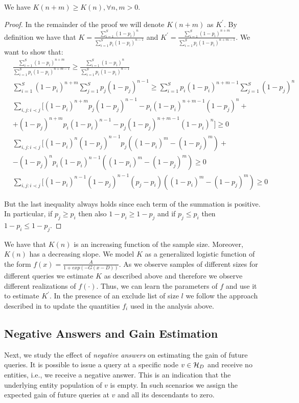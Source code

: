\begin{lemma}
We have $K(n+m) \geq K(n), \forall n,m > 0$.
\end{lemma}
\begin{proof}
In the remainder of the proof we will denote $K(n+m)$ as $K^{\prime}$. By definition we have that $K = \frac{\sum_{i=1}^S (1-p_i)^n}{\sum_{i=1}^S p_i(1-p_i)^{n-1}}$ and $K^{\prime} = \frac{\sum_{i=1}^S (1-p_i)^{n+m}}{\sum_{i=1}^S p_i(1-p_i)^{n+m-1}}$. We want to show that:
{\small
\begin{align}
&\frac{\sum_{i=1}^S (1-p_i)^{n+m}}{\sum_{i=1}^S p_i(1-p_i)^{n+m-1}} \geq \frac{\sum_{i=1}^S (1-p_i)^n}{\sum_{i=1}^S p_i(1-p_i)^{n-1}} \nonumber \\
&\sum_{i=1}^S (1-p_i)^{n+m}\sum_{j=1}^S p_j(1-p_j)^{n-1} \geq \sum_{i=1}^S p_i(1-p_i)^{n+m-1}\sum_{j=1}^S (1-p_j)^n\nonumber \\
&\sum_{i,j:i\prec j}[(1-p_i)^{n+m}p_j(1-p_j)^{n-1} - p_i(1-p_i)^{n+m-1}(1-p_j)^n + \nonumber \\
& + (1-p_j)^{n+m}p_i(1-p_i)^{n-1} - p_j(1-p_j)^{n+m-1}(1-p_i)^n] \geq 0 \nonumber \\
&\sum_{i,j:i\prec j}[(1-p_i)^{n}(1-p_j)^{n-1}p_j((1-p_i)^{m} - (1-p_j)^{m})  + \nonumber \\
& - (1-p_j)^{n}p_i(1-p_i)^{n-1}((1-p_i)^{m} - (1-p_j)^{m}) \geq 0 \nonumber \\
&\sum_{i,j:i\prec j}[(1-p_i)^{n-1}(1-p_j)^{n-1}(p_j-p_i)((1-p_i)^{m} - (1-p_j)^{m}) \geq 0
\end{align}}

But the last inequality always holds since each term of the summation is positive. In particular, if $p_j \geq p_i$ then
also $1-p_i \geq 1-p_j$ and if $p_j \leq p_i$ then $1-p_i \leq 1-p_j$.
\end{proof}

We have that $K(n)$ is an increasing function of the sample size. Moreover, $K(n)$ has a decreasing slope. We model $K$ as a generalized logistic function of the form $f(x) = \frac{A}{1+exp(-G(x-D))}$. As we observe samples of different sizes for different queries we estimate $K$ as described above and therefore we observe different realizations of $f(\cdot)$. Thus, we can learn the parameters of $f$ and use it to estimate $K^{\prime}$. In the presence of an exclude list of size $l$ we follow the approach described in  to update the quantities $f_i$ used in the analysis above. 

\subsection{Negative Answers and Gain Estimation}
Next, we study the effect of {\em negative answers} on estimating the gain of future queries. It is possible to issue a query at a specific node $v \in \mathcal{H}_D$ and receive no entities, i.e., we receive a negative answer. This is an indication that the underlying entity population of $v$ is empty. In such scenarios we assign the expected gain of future queries at $v$ and all its descendants to zero. 

